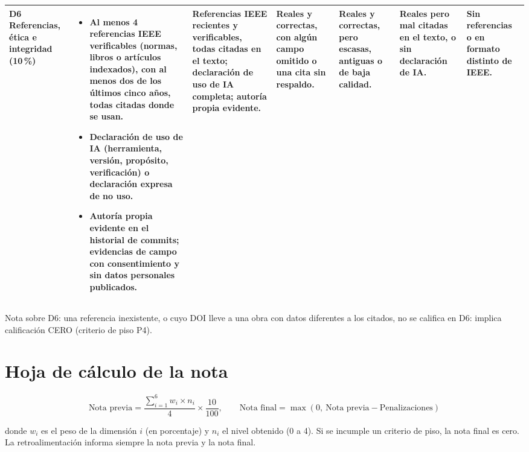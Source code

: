 \documentclass[11pt]{article}
\newcommand{\seccion}[1]{\section{\textcolor{utegreendk}{#1}}}
\begin{document}
\begin{landscape}
{\begin{longtable}{|L{2.4cm}|L{5.6cm}|L{3.1cm}|L{2.8cm}|L{2.8cm}|L{2.7cm}|L{2.1cm}|}
	\hline
	\textbf{D6 Referencias, ética e integridad} (10\,\%) & \begin{itemize}[leftmargin=9pt,itemsep=0pt,topsep=0pt,parsep=0pt,partopsep=0pt,after=\vspace{-\baselineskip}]\item Al menos 4 referencias IEEE verificables (normas, libros o artículos indexados), con al menos dos de los últimos cinco años, todas citadas donde se usan.\item Declaración de uso de IA (herramienta, versión, propósito, verificación) o declaración expresa de no uso.\item Autoría propia evidente en el historial de commits; evidencias de campo con consentimiento y sin datos personales publicados.\end{itemize} & Referencias IEEE recientes y verificables, todas citadas en el texto; declaración de uso de IA completa; autoría propia evidente. & Reales y correctas, con algún campo omitido o una cita sin respaldo. & Reales y correctas, pero escasas, antiguas o de baja calidad. & Reales pero mal citadas en el texto, o sin declaración de IA. & Sin referencias o en formato distinto de IEEE.\\
	\hline
\end{longtable}
}
{\footnotesize Nota sobre D6: una referencia inexistente, o cuyo DOI lleve a una obra con datos diferentes a los citados, no se califica en D6: implica calificación CERO (criterio de piso P4).}
\end{landscape}

\seccion{Hoja de cálculo de la nota}

\[
	\text{Nota previa} = \frac{\sum_{i=1}^{6} w_i \times n_i}{4} \times \frac{10}{100}, \qquad \text{Nota final} = \max\left(0,\ \text{Nota previa} - \text{Penalizaciones}\right)
\]

donde $w_i$ es el peso de la dimensión $i$ (en porcentaje) y $n_i$ el nivel obtenido (0 a 4). Si se incumple un criterio de piso, la nota final es cero. La retroalimentación informa siempre la nota previa y la nota final.
\end{document}
